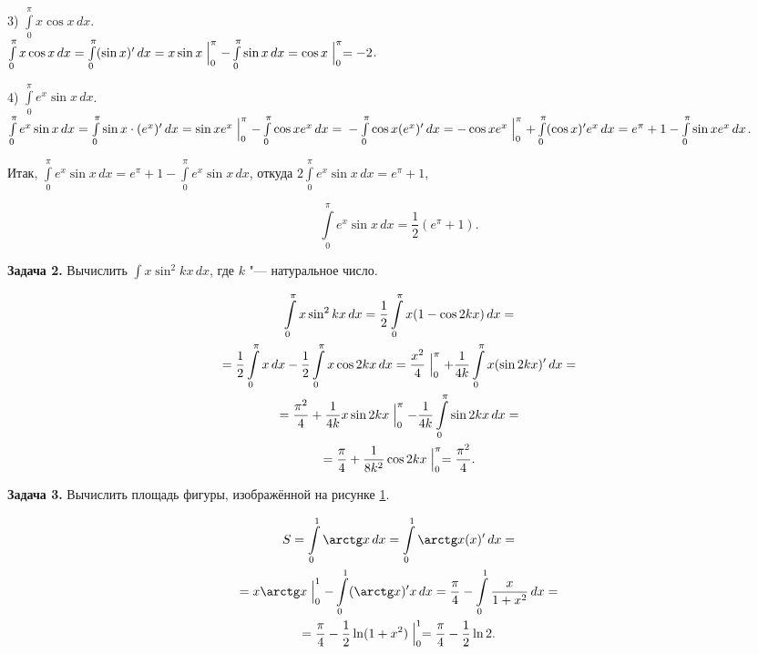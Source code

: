 3) $\int\limits_{0}^{\pi} x \cos x \,dx$. \\
$\int\limits_{0}^{\pi} x \cos x \,dx = \int\limits_{0}^{\pi} (\sin x)^\prime \,dx =
x \sin x \Bigm|_{0}^{\pi}  - \int\limits_{0}^{\pi} \sin x \,dx =
\cos x \Bigm|_{0}^{\pi} = -2$.

4) $\int\limits_{0}^{\pi} e^{x} \sin x \,dx$. \\
$\int\limits_{0}^{\pi} e^{x} \sin x \,dx =
\int\limits_{0}^{\pi} \sin x \cdot (e^{x})^\prime \,dx =
\sin x e^{x} \Bigm|_{0}^{\pi} - \int\limits_{0}^{\pi} \cos x e^{x} \,dx = \\
- \int\limits_{0}^{\pi} \cos x (e^{x})^\prime \,dx =
- \cos x e^{x} \Bigm|_{0}^{\pi} + \int\limits_{0}^{\pi} (\cos x)^\prime e^{x} \,dx =
e^{\pi} + 1 - \int\limits_{0}^{\pi} \sin x e^{x} \,dx$.

Итак,
$\int\limits_{0}^{\pi} e^{x} \sin x \,dx =
e^{\pi} + 1 - \int\limits_{0}^{\pi} e^{x} \sin x \,dx$,
откуда
$2 \int\limits_{0}^{\pi} e^{x} \sin x \,dx = e^{\pi} + 1$, 

\begin{equation*}
\displaystyle \int\limits_{0}^{\pi} e^{x} \sin x \,dx = \frac{1}{2} (e^{\pi} + 1).
\end{equation*}

\textbf{Задача 2.}\label{ex:5_9_2} Вычислить $\displaystyle \int\limits x \sin^{2} kx \, dx$,
где $k$ "--- натуральное число.

\begin{multline*}
\int\limits_{0}^{\pi} x \sin^{2} kx \, dx =
\dfrac{1}{2} \int\limits_{0}^{\pi} x (1 - \cos 2kx) \, dx = \\
= \dfrac{1}{2} \int\limits_{0}^{\pi} x \, dx -
\dfrac{1}{2} \int\limits_{0}^{\pi} x \cos 2kx \, dx = 
\dfrac{x^{2}}{4} \Bigm|_{0}^{\pi} +
\dfrac{1}{4k} \int\limits_{0}^{\pi} x (\sin 2kx)^\prime \, dx = \\
= \dfrac{\pi^{2}}{4} + \dfrac{1}{4k} x \sin 2kx \Bigm|_{0}^{\pi} -
\dfrac{1}{4k} \int\limits_{0}^{\pi} \sin 2kx \, dx = \\
= \dfrac{\pi}{4} + \dfrac{1}{8k^{2}} \cos 2kx \Bigm|_{0}^{\pi} = \dfrac{\pi^{2}}{4}.
\end{multline*}

\textbf{Задача 3.}\label{ex:5_9_3} Вычислить площадь фигуры,
изображённой на рисунке \ref{fig:5_9_19}.

\begin{figure}\label{fig:5_9_19}
\end{figure}

\begin{multline*}
S = \int\limits_{0}^{1} \arctg x \, dx = \int\limits_{0}^{1} \arctg x (x)^\prime \, dx =\\
= x \arctg x \Bigm|_{0}^{1} - \int\limits_{0}^{1} (\arctg x)^\prime x \, dx = 
\dfrac{\pi}{4} - \int\limits_{0}^{1} \dfrac{x}{1 + x^{2}} \, dx = \\
= \dfrac{\pi}{4} - \dfrac{1}{2} \ln (1 + x^{2}) \Bigm|_{0}^{1} = 
\dfrac{\pi}{4} - \dfrac{1}{2} \ln 2.
\end{multline*}
